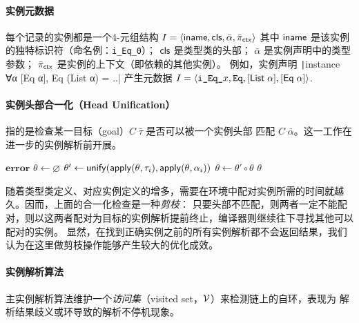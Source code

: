 \paragraph{实例元数据} 每个记录的实例都是一个4-元组结构 $I = \langle \mathsf{iname}, \mathsf{cls},\bar{\alpha},\bar{\pi}_{\mathsf{ctx}} \rangle$
其中
\(\mathsf{iname}\) 是该实例的独特标识符（命名例：\texttt{i\_Eq\_0}）；
\(\mathsf{cls}\) 是类型类的头部；
\(\bar{\alpha}\) 是实例声明中的类型参数；
\(\bar{\pi}_{\mathsf{ctx}}\) 是实例的上下文（即依赖的其他实例）。
例如，实例声明 \texttt|instance ∀α [Eq α], Eq (List α) = ..| 产生元数据
$I = \langle \texttt{i\_Eq\_}x, \texttt{Eq}, [\mathsf{List}\;\alpha], [\mathsf{Eq}\;\alpha] \rangle$.

\paragraph{实例头部合一化（Head Unification）} 指的是检查某一目标（goal）\(C\;\bar{\tau}\) 是否可以被一个实例头部
匹配 \(C\;\bar\alpha\)。这一工作在进一步的实例解析前开展。
\begingroup
{}
\begin{algorithm}
  \caption{Head Unification}
  \begin{algorithmic}[1]
    \State \Return $\mathbf{error}$
    \EndIf
    $\theta \gets \varnothing$
    \State $\theta' \gets \mathsf{unify}(\mathsf{apply}(\theta, \tau_i), \mathsf{apply}(\theta, \alpha_i))$
    \State $\theta \gets \theta' \circ \theta$
    \EndFor
    \Return $\theta$
    \EndFunction
  \end{algorithmic}
\end{algorithm}
\endgroup
随着类型类定义、对应实例定义的增多，需要在环境中配对实例所需的时间就越久。因而，上面的合一化检查是一种\emph{剪枝}：
只要头部不匹配，则两者一定不能配对，则以这两者配对为目标的实例解析提前终止，编译器则继续往下寻找其他可以配对的实例。
显然，在找到正确实例之前的所有实例解析都不会返回结果，我们认为在这里做剪枝操作能够产生较大的优化成效。

\paragraph{实例解析算法}
主实例解析算法维护一个\emph{访问集}（visited set，$\mathcal{V}$）来检测链上的自环，表现为
解析结果歧义或环导致的解析不停机现象。
\begingroup
{}

